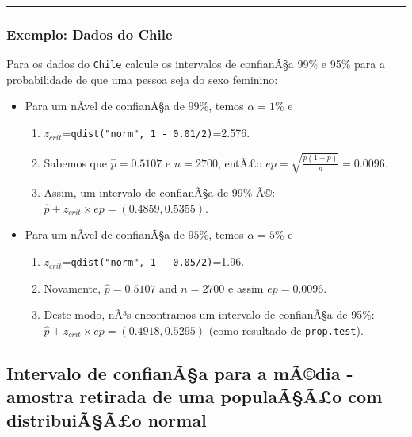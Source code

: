 \documentclass[]{article}
\providecommand{\tightlist}{%
  \setlength{\itemsep}{0pt}\setlength{\parskip}{0pt}}
\begin{document}
\begin{center}\rule{0.5\linewidth}{\linethickness}\end{center}

\subsubsection{Exemplo: Dados do Chile}\label{exemplo-dados-do-chile}

Para os dados do \texttt{Chile} calcule os intervalos de confianÃ§a 99\%
e 95\% para a probabilidade de que uma pessoa seja do sexo feminino:

\begin{itemize}
\tightlist
\item
  Para um nÃ­vel de confianÃ§a de \(99\%\), temos \(\alpha=1\%\) e

  \begin{enumerate}
  \def\labelenumi{\arabic{enumi})}
  \tightlist
  \item
    \(z_{crit}\)=\texttt{qdist("norm",\ 1\ -\ 0.01/2)}=2.576.
  \item
    Sabemos que \(\hat{p}=0.5107\) e \(n=2700\), entÃ£o
    \(ep = \sqrt{\frac{\hat{p}(1-\hat{p})}{n}} = 0.0096\).
  \item
    Assim, um intervalo de confianÃ§a de 99\% Ã©:
    \(\hat{p}\pm z_{crit}\times ep=(0.4859, 0.5355)\).
  \end{enumerate}
\item
  Para um nÃ­vel de confianÃ§a de \(95\%\), temos \(\alpha=5\%\) e

  \begin{enumerate}
  \def\labelenumi{\arabic{enumi})}
  \tightlist
  \item
    \(z_{crit}\)=\texttt{qdist("norm",\ 1\ -\ 0.05/2)}=1.96.
  \item
    Novamente, \(\hat{p}=0.5107\) and \(n=2700\) e assim \(ep=0.0096\).
  \item
    Deste modo, nÃ³s encontramos um intervalo de confianÃ§a de 95\%:
    \(\hat{p}\pm z_{crit}\times ep=(0.4918, 0.5295)\) (como resultado de
    \texttt{prop.test}).
  \end{enumerate}
\end{itemize}

\subsection{Intervalo de confianÃ§a para a mÃ©dia - amostra retirada de
uma populaÃ§Ã£o com distribuiÃ§Ã£o
normal}\label{intervalo-de-confianaa-para-a-madia---amostra-retirada-de-uma-populaaao-com-distribuiaao-normal}
\end{document}
